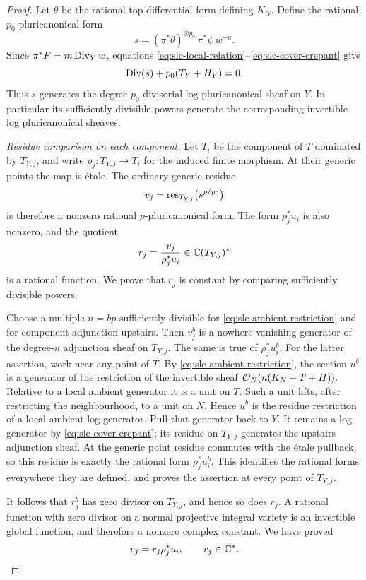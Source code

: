 \begin{proof}
Let $\theta$ be the rational top differential form defining $K_N$.
Define the rational $p_0$-pluricanonical form
\begin{equation}
 \label{eq:slc-cover-generator}
 s=(\pi^*\theta)^{\otimes p_0}\,\pi^*\psi\,w^{-a}.
\end{equation}
Since $\pi^*F=m\operatorname{Div}_Y w$, equations
\eqref{eq:slc-local-relation}--\eqref{eq:slc-cover-crepant} give
\[
 \operatorname{Div}(s)+p_0(T_Y+H_Y)=0.
\]
Thus $s$ generates the degree-$p_0$ divisorial log pluricanonical sheaf
on $Y$.  In particular its sufficiently divisible powers generate the
corresponding invertible log pluricanonical sheaves.

\smallskip
\noindent\emph{Residue comparison on each component.}
Let $T_i$ be the component of $T$ dominated by $T_{Y,j}$, and write
$\rho_j\colon T_{Y,j}\to T_i$ for the induced finite morphism.  At their
generic points the map is \'{e}tale.  The ordinary generic residue
\[
 v_j=\operatorname{res}_{T_{Y,j}}\bigl(s^{p/p_0}\bigr)
\]
is therefore a nonzero rational $p$-pluricanonical form.  The form
$\rho_j^*u_i$ is also nonzero, and the quotient
\begin{equation}
 \label{eq:slc-residue-ratio}
 r_j=\frac{v_j}{\rho_j^*u_i}\in\mathbb C(T_{Y,j})^*
\end{equation}
is a rational function.  We prove that $r_j$ is constant by comparing
sufficiently divisible powers.

Choose a multiple $n=bp$ sufficiently divisible for
\eqref{eq:slc-ambient-restriction} and for component adjunction upstairs.
Then $v_j^b$ is a nowhere-vanishing generator of the degree-$n$
adjunction sheaf on $T_{Y,j}$.  The same is true of $\rho_j^*u_i^b$.
For the latter assertion, work near any point of $T$.  By
\eqref{eq:slc-ambient-restriction}, the section $u^b$ is a generator of
the restriction of the invertible sheaf
$\mathcal O_N(n(K_N+T+H))$.  Relative to a local ambient generator it is a unit
on $T$.  Such a unit lifts, after restricting the neighbourhood, to a
unit on $N$.  Hence $u^b$ is the residue restriction of a local ambient
log generator.  Pull that generator back to $Y$.  It remains a log
generator by \eqref{eq:slc-cover-crepant}; its residue on $T_{Y,j}$
generates the upstairs adjunction sheaf.  At the generic point residue
commutes with the \'{e}tale pullback, so this residue is exactly the
rational form $\rho_j^*u_i^b$.  This identifies the rational forms
everywhere they are defined, and proves the assertion at every point
of $T_{Y,j}$.

It follows that $r_j^b$ has zero divisor on $T_{Y,j}$, and hence so does
$r_j$.  A rational function with zero divisor on a normal projective
integral variety is an invertible global function, and therefore a
nonzero complex constant.  We have proved
\begin{equation}
 \label{eq:slc-component-scalar}
 v_j=r_j\rho_j^*u_i,\qquad r_j\in\mathbb C^*.
\end{equation}


\end{proof}

